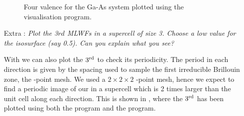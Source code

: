 \begin{enumerate}
\begin{figure}[h!]
\centering
{}
\centering
{}
\centering
{}
\centering
{}
\caption{Four valence \MLWFs{} for the Ga-As system plotted using the \xcrysden{} visualisation program.}\label{fig1.2}
\end{figure}

\item[Extra :] {\it Plot the 3$rd$ MLWFs in a supercell of size 3. Choose a low value for the isosurface (say 0.5). Can
you explain what you see?}

With \xcrysden{} we can also plot the $3\tinysup{rd}$ \MLWF{} to check its periodicity. The period in each direction is given by the spacing used to sample the first irreducible Brillouin zone, \ie{} the \bfk-point mesh. We used a $2\times2\times2$ \bfk-point mesh, hence we expect to find a periodic image of our \MLWF{} in a supercell which is 2 times larger than the unit cell along each direction. This is shown in , where the $3\tinysup{rd}$ has been plotted using both the \xcrysden{} program and the \vesta{} program.
\end{enumerate}

